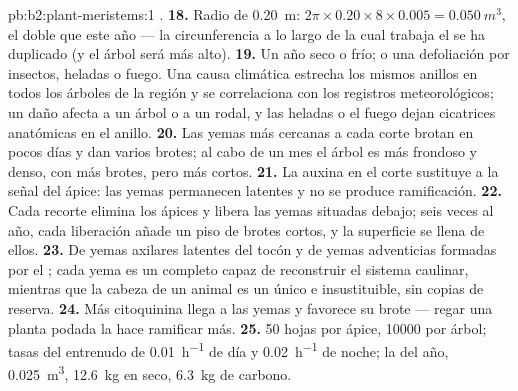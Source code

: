 \begin{solution}{pb:b2:plant-meristems:1}
.
\textbf{18.} Radio de \qty{0.20}{m}: $2\pi\times 0.20\times 8\times
0.005 = \qty{0.050}{m^3}$, el doble que este año --- la circunferencia a lo
largo de la cual trabaja el  se ha duplicado (y el árbol será más
alto).
\textbf{19.} Un año seco o frío; o una defoliación por insectos, heladas o
fuego. Una causa climática estrecha los mismos anillos en todos los
árboles de la región y se correlaciona con los registros meteorológicos;
un daño afecta a un árbol o a un rodal, y las heladas o el fuego dejan
cicatrices anatómicas en el anillo.
\textbf{20.} Las yemas más cercanas a cada corte brotan en pocos días y dan
varios brotes; al cabo de un mes el árbol es más frondoso y denso, con más
brotes, pero más cortos.
\textbf{21.} La auxina en el corte sustituye a la señal del ápice: las
yemas permanecen latentes y no se produce ramificación.
\textbf{22.} Cada recorte elimina los ápices y libera las yemas situadas
debajo; seis veces al año, cada liberación añade un piso de brotes cortos,
y la superficie se llena de ellos.
\textbf{23.} De yemas axilares latentes del tocón y de yemas adventicias
formadas por el ; cada yema es un  completo capaz de
reconstruir el sistema caulinar, mientras que la cabeza de un animal es
un  único e insustituible, sin copias de reserva.
\textbf{24.} Más citoquinina llega a las yemas y favorece su brote ---
regar una planta podada la hace ramificar más.
\textbf{25.} 50 hojas por ápice, \num{10000} por árbol; tasas del entrenudo
de \qty{0.01}{h^{-1}} de día y \qty{0.02}{h^{-1}} de noche; la  del
año, \qty{0.025}{m^3}, \qty{12.6}{kg} en seco, \qty{6.3}{kg} de carbono.
\end{solution}

